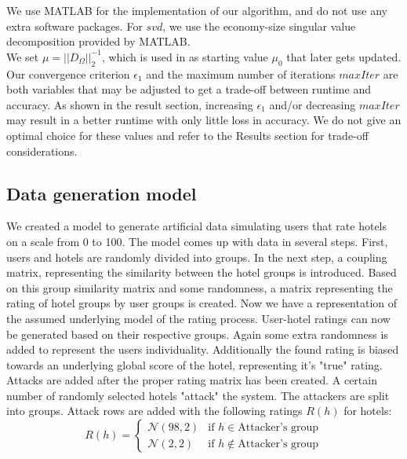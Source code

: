 \documentclass[10pt,conference,compsocconf]{IEEEtran}
\begin{document}
We use MATLAB for the implementation of our algorithm, and do not use any extra software packages.
For $svd$, we use the economy-size singular value decomposition provided by MATLAB. \\

We set $\mu = ||D_{\Omega}||_2^{-1}$, which is used in \cite{almpaper} as starting value $\mu_0$ that later gets updated. \\

Our convergence criterion $\epsilon_1$ and the maximum number of iterations $maxIter$ are both variables that may be adjusted
to get a trade-off between runtime and accuracy. As shown in the result section, increasing $\epsilon_1$ and/or decreasing $maxIter$
may result in a better runtime with only little loss in accuracy. We do not give an optimal choice for these values and refer to the Results section for trade-off considerations.


\subsection{Data generation model}

We created a model to generate artificial data simulating users that rate hotels on a scale from 0 to 100. The model comes up with data in several steps. First, users and hotels are randomly divided into groups. In the next step, a coupling matrix, representing the similarity between the hotel groups is introduced. Based on this group similarity matrix and some randomness, a matrix representing the rating of hotel groups by user groups is created. Now we have a representation of the assumed underlying model of the rating process. User-hotel ratings can now be generated based on their respective groups. Again some extra randomness is added to represent the users individuality. Additionally the found rating is biased towards an underlying global score of the hotel, representing it's "true" rating.\\
Attacks are added after the proper rating matrix has been created. A certain number of randomly selected hotels "attack" the system. The attackers are split into groups. Attack rows are added with the following ratings $R(h)$ for hotels:
\begin{equation*}
R(h) =
\left\{
	\begin{array}{ll}
		\mathcal{N}(98,2)  & \mbox{if } h \in \mbox{Attacker's group} \\
		\mathcal{N}(2,2) & \mbox{if } h \notin \mbox{Attacker's group}
	\end{array}
\right.
\label{eq:}
\end{equation*}
\end{document}

